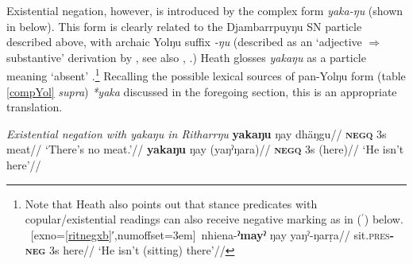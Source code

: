 \documentclass[usenames,dvipsnames,11pt]{article}
\begin{document}
{{Existential negation, however, is introduced by the complex form \textit{yaka-ŋu} (shown in \nextx{} below). This form is clearly related to the Djambarrpuyŋu SN particle described above, with archaic Yolŋu suffix {\textit{-ŋu}} (described as an `adjective $\Rightarrow$ substantive' derivation by \citealt[34]{Schebeck2001}, see also \citealt[174ff]{Wilkinson1991}, \citealt[24]{Heath1980}.) Heath glosses \textit{yakaŋu} as a particle meaning `absent' \citeyearpar[102]{Heath1980}.\footnote{Note that Heath also points out that stance predicates with copular/existential readings can also receive negative marking as in ($^\prime$) below. 
	\pex~[exno=\ref{ritnegxb}′,numoffset=3em]~\begingl\gla nhiena-\textbf{ˀmayˀ} ŋay yaŋˀ-ŋarṛa//
	\glb sit\textsc{.pres\textbf{-neg}} 3\gls{s} here//
	\glft`He isn't (sitting) there'//\endgl \xe
}
Recalling the possible lexical sources of pan-Yolŋu form (table \ref{compYol} \textit{supra}) \textit{*yaka} discussed in the foregoing section, this is an appropriate translation.

\pex\textit{ Existential negation with {\em yakaŋu} in Ritharrŋu}
\a\begingl\gla \textbf{yakaŋu} ŋay dhäŋgu//
\glb\textsc{\textbf{negq}} 3\gls{s} meat//
\glft`There's no meat.'//
\endgl
\a\label{ritnegxb}\begingl\gla \textbf{yakaŋu} ŋay (yaŋˀŋara)//
\glb \textsc{\textbf{negq}} 3\gls{s} (here)//
\glft`He isn't here'//\endgl
\xe

}}
\end{document}

